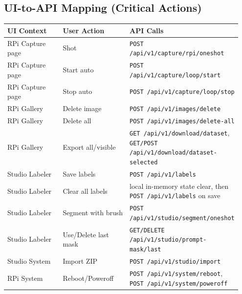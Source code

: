 \subsection{UI-to-API Mapping (Critical Actions)}
\begin{longtable}{p{0.27\linewidth} p{0.30\linewidth} p{0.38\linewidth}}
\toprule
UI Context & User Action & API Calls \\
\midrule
RPi Capture page & Shot & \texttt{POST /api/v1/capture/rpi/oneshot} \\
RPi Capture page & Start auto & \texttt{POST /api/v1/capture/loop/start} \\
RPi Capture page & Stop auto & \texttt{POST /api/v1/capture/loop/stop} \\
RPi Gallery & Delete image & \texttt{POST /api/v1/images/delete} \\
RPi Gallery & Delete all & \texttt{POST /api/v1/images/delete-all} \\
RPi Gallery & Export all/visible & \texttt{GET /api/v1/download/dataset}, \texttt{GET/POST /api/v1/download/dataset-selected} \\
Studio Labeler & Save labels & \texttt{POST /api/v1/labels} \\
Studio Labeler & Clear all labels & local in-memory state clear, then \texttt{POST /api/v1/labels} on save \\
Studio Labeler & Segment with brush & \texttt{POST /api/v1/studio/segment/oneshot} \\
Studio Labeler & Use/Delete last mask & \texttt{GET/DELETE /api/v1/studio/prompt-mask/last} \\
Studio System & Import ZIP & \texttt{POST /api/v1/studio/import} \\
RPi System & Reboot/Poweroff & \texttt{POST /api/v1/system/reboot}, \texttt{POST /api/v1/system/poweroff} \\
\bottomrule
\end{longtable}
